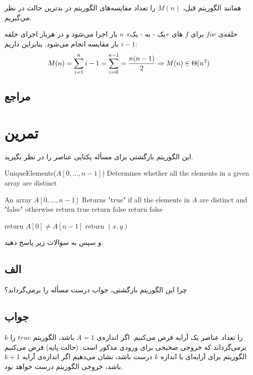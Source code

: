 \documentclass[]{article}
\begin{document}
    همانند الگوریتم قبل، 
    $M(n)$
    را تعداد مقایسه‌های الگوریتم در بدترین حالت در نظر می‌گیریم.
    
    حلقه‌ی 
    $for$
    برای 
    $f$
    های «یک - به - یک»
    $n$
    بار اجرا می‌شود و در هربار اجرای حلقه 
    $i-1$
    بار مقایسه انجام می‌شود. بنابراین داریم:
    $$\displaystyle M(n) = \sum_{i=1}^n i - 1 = \sum_{i=0}^{n-1} = \frac{n(n-1)}{2}\\
    \Rightarrow M(n) \in \Theta(n^2)$$
    
    \subsection*{مراجع}

    \pagebreak
\section{تمرین}
این الگوریتم بازگشتی برای مسأله یکتایی عناصر را در نظر بگیرید.
\begin{latin}
\begin{algorithm}
        \caption{UniqueElements($A[0, \ldots, n - 1]$)
        Determines whether all the elements in a given array are distinct} 
        \begin{algorithmic}
            \Require An array $A[0, ..., n-1]$
            \Ensure Returns "true" if all the elements in $A$ are distinct and "false" otherwise 
                \State return true
                \State return false
                \State return false
            \Else 

                \State return $A[0] \neq A[n - 1]$
            \EndIf
            \State return $(x, y)$
        \end{algorithmic}
        \end{algorithm}
\end{latin}
و سپس به سوالات زیر پاسخ دهید.

\subsection{الف}
چرا این الگوریتم بازگشتی، جواب درست مسأله را برمی‌گرداند؟
\subsection*{جواب}
$k$
را تعداد عناصر یک آرایه فرض می‌کنیم. اگر اندازه‌ی
$A = 1$
باشد، الگوریتم
$true$
را برمی‌گرداند که خروجی صحیحی برای ورودی مذکور است. (حالت پایه)
فرض می‌کنیم الگوریتم برای آرایه‌ای با اندازه
$k$
درست باشد، نشان می‌دهیم اگر اندازه‌ی آرایه
$k+1$
باشد، خروجی الگوریتم درست خواهد بود.
\end{document}
